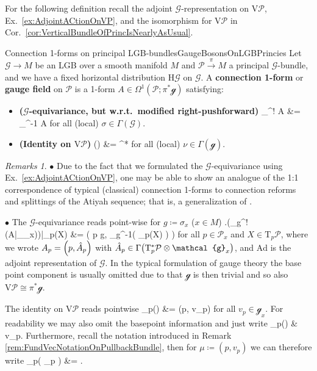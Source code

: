 \documentclass[a4paper,oneside,11pt,bibliography=totoc]{scrartcl}
\DeclareMathOperator{\sAd}{\mathKel{A\mkern-5.5mu d}}
\def\bas#1\eas{\begin{align*}#1\end{align*}}
\theoremstyle{plain}
\theoremstyle{remark}
\newtheorem{remark}[theorem]{Remarks}
\theoremstyle{definition}
\begin{document}
For the following definition recall the adjoint $\mathcal{G}$-representation on $\mathrm{V}\mathcal{P}$, Ex.\ \ref{ex:AdjointACtionOnVP}, and the isomorphism for $\mathrm{V}\mathcal{P}$ in Cor.\ \ref{cor:VerticalBundleOfPrincIsNearlyAsUsual}.

\begin{definitions}{Connection 1-forms on principal LGB-bundles}{GaugeBosonsOnLGBPrincies}
Let $\mathcal{G} \to M$ be an LGB over a smooth manifold $M$ and $\mathcal{P} \stackrel{\pi}{\to} M$ a principal $\mathcal{G}$-bundle, and we have a fixed horizontal distribution $\mathrm{H}\mathcal{G}$ on $\mathcal{G}$. A \textbf{connection 1-form} or \textbf{gauge field} on $\mathcal{P}$ is a 1-form $A \in \Omega^1(\mathcal{P}; \pi^*\mathcal{g})$ satisfying:
\begin{itemize}
	\item \textbf{($\mathcal{G}$-equivariance, but w.r.t.\ modified right-pushforward)}
		\bas 
			\mathcal{r}_\sigma^! A
			&=
			\sAd_{\sigma^{-1}} \circ A
		\eas
	for all (local) $\sigma \in \Gamma(\mathcal{G})$.
	\item \textbf{(Identity on $\mathrm{V}\mathcal{P}$)}
	\bas
	A\mleft(\widetilde{\nu}\mright)
	&=
	\pi^*\nu
	\eas
	for all (local) $\nu \in \Gamma(\mathcal{g})$.
\end{itemize}
\end{definitions}

\begin{remark}
\leavevmode\newline
\indent $\bullet$ Due to the fact that we formulated the $\mathcal{G}$-equivariance using Ex.\ \ref{ex:AdjointACtionOnVP}, one may be able to show an analogue of the 1:1 correspondence of typical (classical) connection 1-forms to connection reforms and splittings of the Atiyah sequence; that is, a generalization of \cite[\S 3.2, page 90 ff.]{mackenzieGeneralTheory}.

$\bullet$ The $\mathcal{G}$-equivariance reads point-wise for $g \coloneqq \sigma_x$ ($x\in M$)
\bas
\mleft.\mleft(_g^! \mleft(A|_{_x}\mright)\mright)\mright|_{p}(X)
&=
\mleft(
	p \cdot g, 
	_{g^{-1}}\mleft( _p(X) \mright)
\mright)
\eas
for all $p \in \mathcal{P}_x$ and $X \in \mathrm{T}_p\mathcal{P}$,
where we wrote $A_p = \mleft(p, \hat{A}_p\mright)$ with $\hat{A}_p \in \Gamma\mleft( \mathrm{T}^*_p\mathcal{P} \otimes \mathcal{g}_x \mright)$, and $\mathrm{Ad}$ is the adjoint representation of $\mathcal{G}$. In the typical formulation of gauge theory the base point component is usually omitted due to that $\mathcal{g}$ is then trivial and so also $\mathrm{V}\mathcal{P} \cong \pi^*\mathcal{g}$.

The identity on $\mathrm{V}\mathcal{P}$ reads pointwise
\bas
A_p()
&=
(p, v_p)
\eas
for all $v_p \in \mathcal{g}_x$. For readability we may also omit the basepoint information and just write
\bas
A_p()
&\equiv
v_p.
\eas
Furthermore, recall the notation introduced in Remark \ref{rem:FundVecNotationOnPullbackBundle}, then for $\mu \coloneqq (p, v_p)$ we can therefore write
\bas
A_p\mleft( \widetilde{\mu}_p \mright)
&=
\mu.
\eas
\end{remark}
\end{document}
